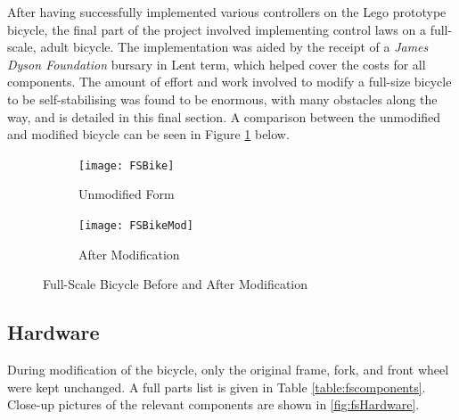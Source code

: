 After having successfully implemented various controllers on the Lego prototype bicycle, the final part of the project involved implementing control laws on a full-scale, adult bicycle. The implementation was aided by the receipt of a \textit{James Dyson Foundation} bursary in Lent term, which helped cover the costs for all components. The amount of effort and work involved to modify a full-size bicycle to be self-stabilising was found to be enormous, with many obstacles along the way, and is detailed in this final section. A comparison between the unmodified and modified bicycle can be seen in Figure \ref{fig:fsvsfsmod} below.

\begin{figure}[H]
	\begin{subfigure}{0.475\textwidth}
	\texttt{[image: FSBike]}
	\caption{Unmodified Form}
	\end{subfigure} \hfill
	\begin{subfigure}{0.475\textwidth}
	\texttt{[image: FSBikeMod]}
	\caption{After Modification}
	\end{subfigure}
	\caption{Full-Scale Bicycle Before and After Modification}
	\label{fig:fsvsfsmod}
\end{figure}

\subsection{Hardware}
During modification of the bicycle, only the original frame, fork, and front wheel were kept unchanged. A full parts list is given in Table \ref{table:fscomponents}. Close-up pictures of the relevant components are shown in \ref{fig:fsHardware}.


